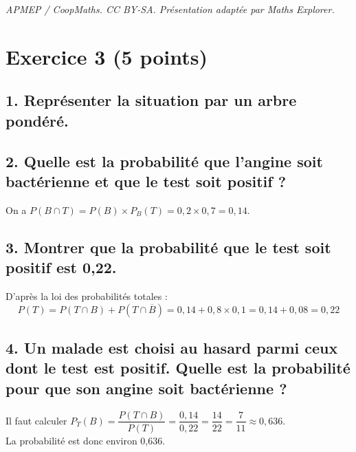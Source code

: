 \documentclass[10pt]{article}
\begin{document}
\noindent\textit{APMEP / CoopMaths. CC BY-SA. Présentation adaptée par Maths Explorer.}\par\medskip
\section*{Exercice 3 (5 points)}
	

	
	\subsection*{1. Représenter la situation par un arbre pondéré.}
	
\begin{center}
\end{center}
	
	\subsection*{2. Quelle est la probabilité que l’angine soit bactérienne et que le test soit positif ?}
	
	On a $P(B \cap T) = P(B) \times P_B(T) = 0,2 \times 0,7 = 0,14$.
	
	\subsection*{3. Montrer que la probabilité que le test soit positif est 0,22.}
	
	D’après la loi des probabilités totales :
	\[
	P(T) = P(T \cap B) + P(T \cap \overline{B}) = 0,14 + 0,8 \times 0,1 = 0,14 + 0,08 = 0,22
	\]
	
	\subsection*{4. Un malade est choisi au hasard parmi ceux dont le test est positif. Quelle est la probabilité pour que son angine soit bactérienne ?}
	
	Il faut calculer $P_T(B) = \dfrac{P(T \cap B)}{P(T)} = \dfrac{0,14}{0,22} = \dfrac{14}{22} = \dfrac{7}{11} \approx 0,636$.\\ La probabilité est donc environ 0,636.
\end{document}
